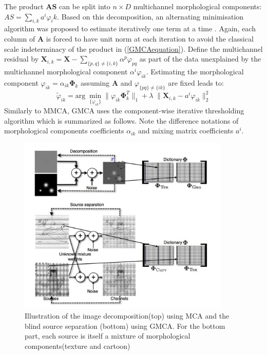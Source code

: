 The product $\mathbf{AS}$ can be split into $n\times D$ multichannel morphological components: $AS = \sum_{i,k}a^i\varphi_ik$. Based on this decomposition, an alternating minimisation algorithm was proposed to estimate iteratively one term at a time \cite{BobinJ_2007SaMD}. Again, each column of $\mathbf{A}$ is forced to have unit norm at each iteration to avoid the classical scale indeterminacy of the product in (\ref{GMCAequation}). Define the multichannel residual by $\mathbf{X}_{i,k} = \mathbf{X} - \sum_{\{p,q\}\neq \{i,k\}} \alpha^p \varphi_{pq}$ as part of the data unexplained by the multichannel morphological component $\alpha^i \varphi_{ik}$. Estimating the morphological component $\varphi_{ik} = \alpha_{ik}\mathbf{\Phi}_k$ assuming $\mathbf{A}$ and $\varphi_{\{pq\} \neq \{ik\}}$ are fixed leads to: 
\begin{equation}
    \tilde{\varphi}_{ik} = \text{arg} \; \min_{\{\varphi_{ik}\}} \lVert \varphi_{ik}\mathbf{\Phi}_k^T\rVert_{1} + \lambda \; \lVert \mathbf{X}_{i,k} - a^i\varphi_{ik}\rVert_2^2
\end{equation}
Similarly to MMCA, GMCA uses the component-wise iterative thresholding algorithm which is summarized as follows. Note the difference notations of morphological components coefficients $\alpha_{ik}$ and mixing matrix coefficients $a^i$.

\begin{figure}[H]
\centering
\includegraphics[width=0.9\textwidth]{images/mca_gmca.png}
\caption{Illustration of the image decomposition(top) using MCA and the blind source separation (bottom) using GMCA. For the bottom part, each source is itself a mixture of morphological components(texture and cartoon)}
\label{Ins_LMM}
\end{figure}

